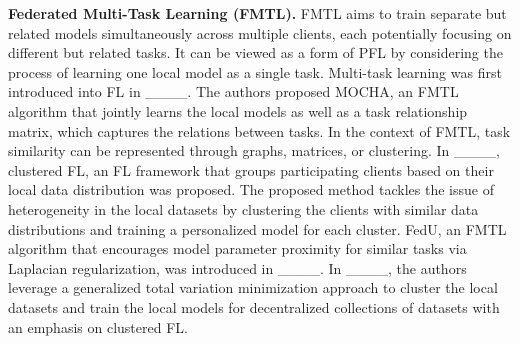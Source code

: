 \iffalse
\textbf{Heterogeneous FL (HFL).} Unlike traditional FL paradigms that assume uniform model structures across all clients, HFL accommodates variations in model sizes, layers, and computational capabilities, thereby enabling more flexible and inclusive participation. One of the primary challenges in HFL is ensuring effective knowledge sharing and aggregation among clients with disparate models. To tackle this, many HFL approaches leverage knowledge distillation techniques, where a public dataset or a subset of data is used to distill knowledge from heterogeneous local models into a unified global model ____. For instance, FedMD ____ employs model distillation to allow clients with different model architectures to contribute to a shared global model without necessitating architectural alignment. Additionally, techniques such as adaptive model aggregation ____ and model compatibility layers ____ have been proposed to facilitate the seamless integration of diverse model updates. Another significant aspect of HFL is the consideration of clients' varying computational resources and communication capabilities. Moreover, recent advancements have introduced the use of parameter-efficient fine-tuning methods to support heterogeneity in model architectures ____.
\fi
\textbf{Federated Multi-Task Learning (FMTL).} FMTL aims to train separate but related models simultaneously across multiple clients, each potentially focusing on different but related tasks. It can be viewed as a form of PFL by considering the process of learning one local model as a single task.  Multi-task learning was first introduced into FL in ____. The authors proposed MOCHA, an FMTL algorithm that jointly learns the local models as well as a task relationship matrix, which captures the relations between tasks.  In the context of FMTL, task similarity can be represented through graphs, matrices, or clustering. In ____, clustered FL, an FL framework that groups participating clients based on their local data distribution was proposed. The proposed method tackles the issue of heterogeneity in the local datasets by clustering the clients with similar data distributions and training a personalized model for each cluster. FedU, an FMTL algorithm that encourages model parameter proximity for similar tasks via Laplacian regularization, was introduced in ____. In ____, the authors leverage a generalized total variation minimization approach to cluster the local datasets and train the local models for decentralized collections of datasets with an emphasis on clustered FL. %

